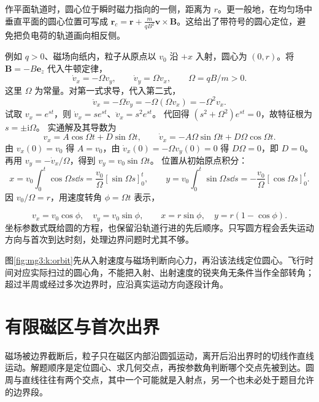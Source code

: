 作平面轨道时，圆心位于瞬时磁力指向的一侧，距离为 $r$。更一般地，在均匀场中垂直平面的圆心位置可写成 $\bm r_c=\bm r+\frac{m}{qB^2}\bm v\times\bm B$。这给出了带符号的圆心定位，避免把负电荷的轨道画向相反侧。


例如 $q>0$、磁场向纸内，粒子从原点以 $v_0$ 沿 $+x$ 入射，圆心为 $(0,r)$。将 $\bm B=-B\bm e_z$ 代入牛顿定律，
\[
 \dot v_x=-\Omega v_y,\qquad \dot v_y=\Omega v_x,\qquad
 \Omega=qB/m>0.
\]
这里 $\Omega$ 为常量。对第一式求导，代入第二式，
\[
 \ddot v_x=-\Omega\dot v_y=-\Omega(\Omega v_x)=-\Omega^2v_x.
\]
试取 $v_x=e^{st}$，则 $\dot v_x=se^{st}$、$\ddot v_x=s^2e^{st}$。
代回得 $(s^2+\Omega^2)e^{st}=0$，故特征根为 $s=\pm\mathrm i\Omega$。
实通解及其导数为
\[
 v_x=A\cos\Omega t+D\sin\Omega t,\qquad
 \dot v_x=-A\Omega\sin\Omega t+D\Omega\cos\Omega t.
\]
由 $v_x(0)=v_0$ 得 $A=v_0$，由 $\dot v_x(0)=-\Omega v_y(0)=0$ 得 $D\Omega=0$，即 $D=0$。
再用 $v_y=-\dot v_x/\Omega$，得到 $v_y=v_0\sin\Omega t$。
位置从初始原点积分：
\[
 x=v_0\int_0^t\cos\Omega s\dd s
   =\frac{v_0}{\Omega}[\sin\Omega s]_0^t,\qquad
 y=v_0\int_0^t\sin\Omega s\dd s
   =-\frac{v_0}{\Omega}[\cos\Omega s]_0^t.
\]
因 $v_0/\Omega=r$，用速度转角 $\phi=\Omega t$ 表示，

\[
v_x=v_0\cos\phi,\quad v_y=v_0\sin\phi,\qquad
x=r\sin\phi,\quad y=r(1-\cos\phi).
\]
坐标参数式既给圆的方程，也保留沿轨道行进的先后顺序。只写圆方程会丢失运动方向与首次到达时刻，处理边界问题时尤其不够。

图\ref{fig:mg3:k:orbit}先从入射速度与磁场判断向心力，再沿该法线定位圆心。飞行时间对应实际扫过的圆心角，不能把入射、出射速度的锐夹角无条件当作全部转角；超过半周或经过多次边界时，应沿真实运动方向逐段计角。


\section{有限磁区与首次出界}
磁场被边界截断后，粒子只在磁区内部沿圆弧运动，离开后沿出界时的切线作直线运动。解题顺序是定位圆心、求几何交点，再按参数角判断哪个交点先被到达。圆周与直线往往有两个交点，其中一个可能就是入射点，另一个也未必处于题目允许的边界段。


